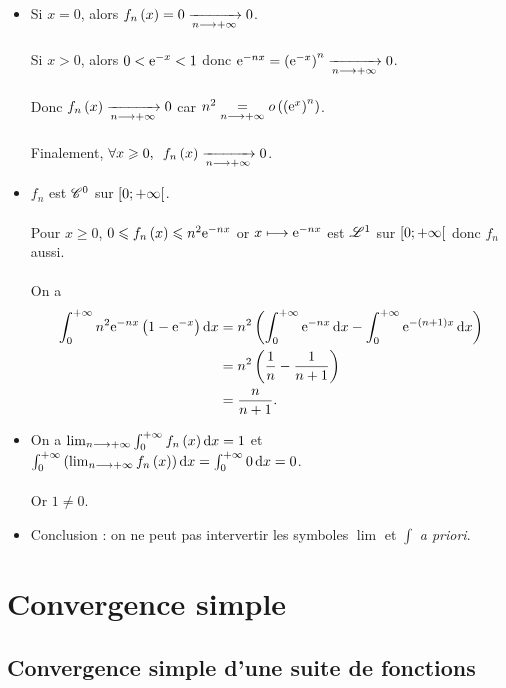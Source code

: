 \begin{corr}
\begin{itemize}
    \item Si \(x=0\), alors \(f_n\left(x\right)=0\xrightarrow[n\longrightarrow+\infty]{}0\). \\\\ Si \(x>0\), alors \(0<\mathrm{e}^{-x}<1\) donc \(\mathrm{e}^{-nx}=\left(\mathrm{e}^{-x}\right)^n\xrightarrow[n\longrightarrow+\infty]{}0\). \\\\ Donc \(f_n\left(x\right)\xrightarrow[n\longrightarrow+\infty]{}0\) car \(n^2\underset{n\longrightarrow+\infty}{=}o\left(\left(\mathrm{e}^{x}\right)^n\right)\). \\\\ Finalement, \(\quantifs{\forall x\geq0}f_n\paren{x}\tendqd{n\to\pinf}0\). \\
    \item \(f_n\) est \(\mathscr{C}^{0}\) sur \(\left[0;+\infty\right[\). \\\\ Pour \(x\geq0\), \(0\leqslant f_n\left(x\right)\leqslant n^2\mathrm{e}^{-nx}\) or \(x\longmapsto\mathrm{e}^{-nx}\) est \(\integ{1}{}{}\) sur \(\left[0;+\infty\right[\) donc \(f_n\) aussi. \\\\ On a \[\begin{aligned}
        \int_0^{\pinf}n^2\e{-nx}\paren{1-\e{-x}}\odif{x}&=n^2\paren{\int_0^{\pinf}\e{-nx}\odif{x}-\int_0^{\pinf}\e{-\paren{n+1}x}\odif{x}} \\
        &=n^2\paren{\dfrac{1}{n}-\dfrac{1}{n+1}} \\
        &=\dfrac{n}{n+1}.
    \end{aligned}\]
    \item On a \(\lim_{n\to\pinf}\int_0^{\pinf}f_n\paren{x}\odif{x}=1\) et \(\int_0^{\pinf}\paren{\lim_{n\to\pinf}f_n\paren{x}}\odif{x}=\int_0^{\pinf}0\odif{x}=0\). \\\\ Or \(1\not=0\). \\
    \item Conclusion : on ne peut pas intervertir les symboles \(\lim\) et \(\int\) \textit{a priori}.
\end{itemize}
\end{corr}

\section{Convergence simple}

\subsection{Convergence simple d'une suite de fonctions}

